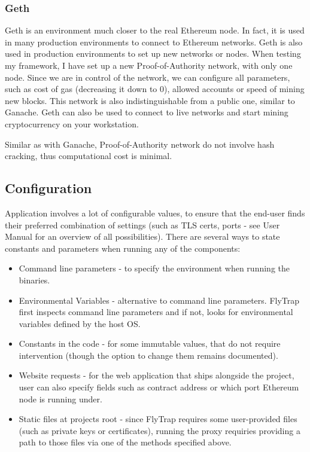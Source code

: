 \subsubsection{Geth}
Geth is an environment much closer to the real Ethereum node. In fact, it is used in many production environments to connect to Ethereum networks. Geth is also used in production environments to set up new networks or nodes. When testing my framework, I have set up a new Proof-of-Authority network, with only one node. Since we are in control of the network, we can configure all parameters, such as cost of gas (decreasing it down to 0), allowed accounts or speed of mining new blocks. This network is also indistinguishable from a public one, similar to Ganache. Geth can also be used to connect to live networks and start mining cryptocurrency on your workstation.

Similar as with Ganache, Proof-of-Authority network do not involve hash cracking, thus computational cost is minimal.

\subsection{Configuration}
Application involves a lot of configurable values, to ensure that the end-user finds their preferred combination of settings (such as TLS certs, ports - see User Manual for an overview of all possibilities). There are several ways to state constants and parameters when running any of the components:
\begin{itemize}
    \item Command line parameters - to specify the environment when running the binaries.
    \item Environmental Variables - alternative to command line parameters. FlyTrap first inspects command line parameters and if not, looks for environmental variables defined by the host OS.
    \item Constants in the code - for some immutable values, that do not require intervention (though the option to change them remains documented).
    \item Website requests - for the web application that ships alongside the project, user can also specify fields such as contract address or which port Ethereum node is running under.
    \item Static files at projects root - since FlyTrap requires some user-provided files (such as private keys or certificates), running the proxy requiries providing a path to those files via one of the methods specified above.
\end{itemize}
